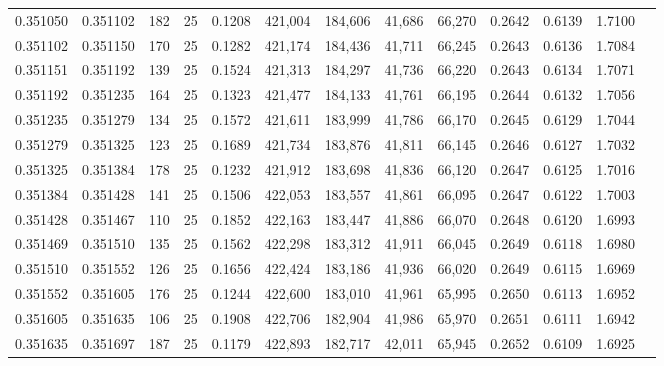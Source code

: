 \begin{tabular}{rrrrrrrrrrrrr}
0.351050 & 0.351102 &   182 &  25 &                                     0.1208 & 421,004 & 184,606 &  41,686 &  66,270 & 0.2642 & 0.6139 & 1.7100 \\
0.351102 & 0.351150 &   170 &  25 &                                     0.1282 & 421,174 & 184,436 &  41,711 &  66,245 & 0.2643 & 0.6136 & 1.7084 \\
0.351151 & 0.351192 &   139 &  25 &                                     0.1524 & 421,313 & 184,297 &  41,736 &  66,220 & 0.2643 & 0.6134 & 1.7071 \\
0.351192 & 0.351235 &   164 &  25 &                                     0.1323 & 421,477 & 184,133 &  41,761 &  66,195 & 0.2644 & 0.6132 & 1.7056 \\
0.351235 & 0.351279 &   134 &  25 &                                     0.1572 & 421,611 & 183,999 &  41,786 &  66,170 & 0.2645 & 0.6129 & 1.7044 \\
0.351279 & 0.351325 &   123 &  25 &                                     0.1689 & 421,734 & 183,876 &  41,811 &  66,145 & 0.2646 & 0.6127 & 1.7032 \\
0.351325 & 0.351384 &   178 &  25 &                                     0.1232 & 421,912 & 183,698 &  41,836 &  66,120 & 0.2647 & 0.6125 & 1.7016 \\
0.351384 & 0.351428 &   141 &  25 &                                     0.1506 & 422,053 & 183,557 &  41,861 &  66,095 & 0.2647 & 0.6122 & 1.7003 \\
0.351428 & 0.351467 &   110 &  25 &                                     0.1852 & 422,163 & 183,447 &  41,886 &  66,070 & 0.2648 & 0.6120 & 1.6993 \\
0.351469 & 0.351510 &   135 &  25 &                                     0.1562 & 422,298 & 183,312 &  41,911 &  66,045 & 0.2649 & 0.6118 & 1.6980 \\
0.351510 & 0.351552 &   126 &  25 &                                     0.1656 & 422,424 & 183,186 &  41,936 &  66,020 & 0.2649 & 0.6115 & 1.6969 \\
0.351552 & 0.351605 &   176 &  25 &                                     0.1244 & 422,600 & 183,010 &  41,961 &  65,995 & 0.2650 & 0.6113 & 1.6952 \\
0.351605 & 0.351635 &   106 &  25 &                                     0.1908 & 422,706 & 182,904 &  41,986 &  65,970 & 0.2651 & 0.6111 & 1.6942 \\
0.351635 & 0.351697 &   187 &  25 &                                     0.1179 & 422,893 & 182,717 &  42,011 &  65,945 & 0.2652 & 0.6109 & 1.6925 \\

\end{tabular}
